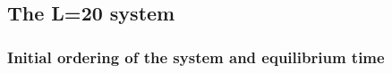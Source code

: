 

\subsection{The L=20 system}


\subsubsection{Initial ordering of the system and equilibrium time}

